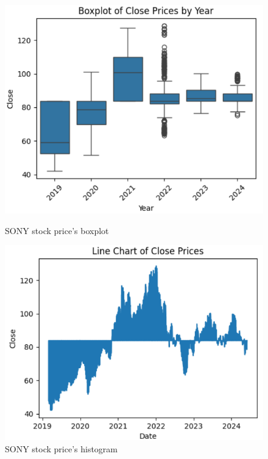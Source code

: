 \documentclass{article}
\begin{document}
\begin{multicols}{2}
\begin{figure}[H]
    \centering
    \begin{minipage}{0.23\textwidth}
    \centering
    \includegraphics[width=1\textwidth]{Image/DatasetImg/SONY_Boxplot.png}
    \caption{SONY stock price's boxplot}
    \label{fig:1}
    \end{minipage}
    \hfill
    \begin{minipage}{0.23\textwidth}
    \centering
    \includegraphics[width=1\textwidth]{Image/DatasetImg/SONY_LineChart.png}
    \caption{SONY stock price's histogram}
    \label{fig:2}
    \end{minipage}
\end{figure}


\end{multicols}
\end{document}
